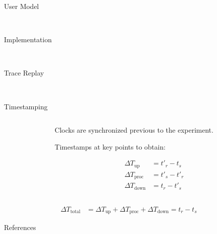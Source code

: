 \documentclass[aspectratio=1610]{beamer}
\begin{document}
\begin{frame}{User Model}
    \begin{center}
        \\
        \vspace{.1\textheight}%
    \end{center}
\end{frame}

\begin{frame}{Implementation}
    \begin{center}
        \\
        \vspace{.1\textheight}
    \end{center}
\end{frame}

\begin{frame}{Trace Replay}
    \begin{center}
        \\
    \end{center}
\end{frame}

\begin{frame}{Timestamping}
    \begin{columns}[onlytextwidth]
        \begin{column}{.5\linewidth}
            \footnotesize%
            \raggedright%
            
        \end{column}%
        \begin{column}{.5\linewidth}
            Clocks are synchronized previous to the experiment.

            \vspace{\baselineskip}%
            Timestamps at key points to obtain:

            \begin{align}
                {\Delta}T_\text{up}   & = t'_{r} - t_{s}  \\
                {\Delta}T_\text{proc} & = t'_{s} - t'_{r} \\
                {\Delta}T_\text{down} & = t_{r} - t'_{s}
            \end{align}
        \end{column}%
    \end{columns}
    \begin{align}
        {\Delta}T_\text{total} & = {\Delta}T_\text{up} + {\Delta}T_\text{proc} + {\Delta}T_\text{down} = t_{r} - t_{s}
    \end{align}
\end{frame}

\begin{frame}[allowframebreaks, t]{References}
    \nocite{*}
    \printbibliography%
\end{frame}
\end{document}
